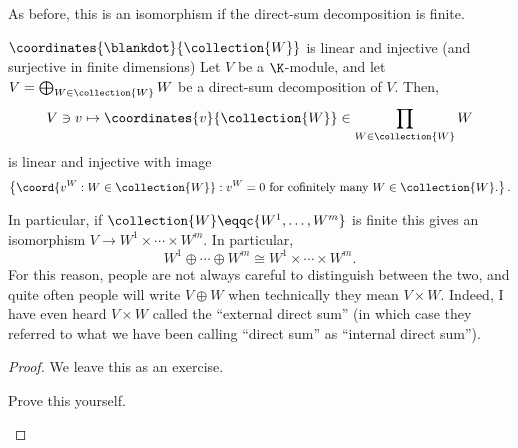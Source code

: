 As before, this is an isomorphism if the direct-sum decomposition is finite.
\begin{prp}{$\coordinates{\blankdot}{\collection{W}}$ is linear and injective (and surjective in finite dimensions)}{}
	Let $V$ be a $\K$-module, and let $V=\bigoplus _{W\in \collection{W}}W$ be a direct-sum decomposition of $V$.  Then,
	\begin{equation}
		V\ni v\mapsto \coordinates{v}{\collection{W}}\in \prod _{W\in \collection{W}}W
	\end{equation}
	is linear and injective with image
	\begin{equation}
		\left\{ \coord{v^W:W\in \collection{W}}:v^W=0\text{ for cofinitely many }W\in \collection{W}\text{.}\right\} .
	\end{equation}
	\begin{rmk}
		In particular, if $\collection{W}\eqqc \{ W^1,\ldots ,W^m\}$ is finite this gives an isomorphism $V\rightarrow W^1\times \cdots \times W^m$.  In particular,
		\begin{equation}
			W^1\oplus \cdots \oplus W^m\cong W^1\times \cdots \times W^m.
		\end{equation}
		For this reason, people are not always careful to distinguish between the two, and quite often people will write $V\oplus W$ when technically they mean $V\times W$.  Indeed, I have even heard $V\times W$ called the ``external direct sum'' (in which case they referred to what we have been calling ``direct sum'' as ``internal direct sum'').
	\end{rmk}
	\begin{proof}
		We leave this as an exercise.
		\begin{exr}[breakable=false]{}{}
			Prove this yourself.
		\end{exr}
	\end{proof}
\end{prp}

